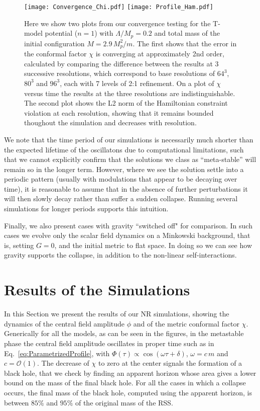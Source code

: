 \documentclass[11pt,a4paper]{article}
\begin{document}
\begin{figure}
    \centering
    \texttt{[image: Convergence\_Chi.pdf]}
    \texttt{[image: Profile\_Ham.pdf]}
    \caption{Here we show two plots from our convergence testing for the T-model potential ($n=1$) with $\Lambda/M_p = 0.2$ and total mass of the initial configuration $M = 2.9 \, M_p^2/m$. The first shows that the error in the conformal factor $\chi$ is converging at approximately 2nd order, calculated by comparing the difference between the results at 3 successive resolutions, which correspond to base resolutions of $64^3$, $80^3$ and $96^3$, each with 7 levels of 2:1 refinement. On a plot of $\chi$ versus time the results at the three resolutions are indistinguishable. The second plot shows the L2 norm of the Hamiltonian constraint violation at each resolution, showing that it remains bounded thoughout the simulation and decreases with resolution.}
\label{fig:Converge}
\end{figure}

We note that the time period of our simulations is necessarily much shorter than the expected lifetime of the oscillatons due to computational limitations, such that we cannot explicitly confirm that the solutions we class as ``meta-stable'' will remain so in the longer term. However, where we see the solution settle into a periodic pattern (usually with modulations that appear to be decaying over time), it is reasonable to assume that in the absence of further perturbations it will then slowly decay rather than suffer a sudden collapse. Running several simulations for longer periods supports this intuition.
 
Finally, we also present cases with gravity ``switched off" for comparison. In such cases we evolve only the scalar field dynamics on a Minkowski background, that is, setting $G=0$, and the initial metric to flat space. In doing so we can see how gravity supports the collapse, in addition to the non-linear self-interactions.

\section{Results of the Simulations}
\label{sec:Results}

In this Section we present the results of our NR simulations, showing the dynamics of the central field amplitude $\phi$ and of the metric conformal factor $\chi$. Generically for all the models, as can be seen in the figures,  in the metastable phase the central field amplitude oscillates in proper time such as in Eq.~\eqref{eq:ParametrizedProfile}, with $\Phi(\tau) \propto \cos(\omega \tau + \delta)$, $\omega = c\, m$ and $c=\mathcal{O}(1)$. The decrease of $\chi$ to zero at the center signals the formation of a black hole, that we check by finding an apparent horizon whose area gives a lower bound on the mass of the final black hole. For all the cases in which a collapse occurs, the final mass of the black hole, computed using the apparent horizon, is between $85\%$ and $95\%$ of the original mass of the RSS.
\end{document}
